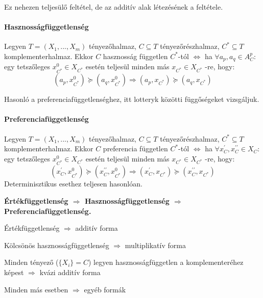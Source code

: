 \documentclass[a4paper,12pt]{article}
\begin{document}
Ez nehezen teljesülő feltétel, de az additív alak létezésének a feltétele.

\paragraph{Hasznosságfüggetlenség}

Legyen $T=(X_1,...,X_m)$ tényezőhalmaz, $C \subseteq T$ tényezőrészhalmaz,  $C^* \subseteq T $ komplementerhalmaz. Ekkor $C$ hasznosság független $C^*$-tól $\Leftrightarrow$ ha $\forall a_{p}, a_q \in A^p_C:$  egy tetszőleges $x_{C^{*}}^0 \in X_{C^*}$  esetén teljesül minden más $ x_{C^{*}} \in X_{C^*}$ -re, hogy:
\begin{equation}
(a_p, x_{C^{*}}^0) \succeq (a_q, x_{C^{*}}^0) 
\Rightarrow
(a_p, x_{C^{*}}) \succeq (a_q, x_{C^{*}}) 
\end{equation}

Hasonló a preferenciafüggetlenséghez, itt lotteryk közötti függőségeket vizsgáljuk.

\paragraph{Preferenciafüggetlenség}

Legyen $T=(X_1,...,X_m)$ tényezőhalmaz, $C \subseteq T$ tényezőrészhalmaz,  $C^* \subseteq T $ komplementerhalmaz. Ekkor $C$ preferencia független $C^*$-tól $\Leftrightarrow$ ha $\forall x_C^{\prime}, x_C^{\prime\prime} \in X_C:$  egy tetszőleges $x_{C^{*}}^0 \in X_{C^*}$  esetén teljesül minden más $ x_{C^{*}} \in X_{C^*}$ -re, hogy:
\begin{equation}
(x_C^{\prime}, x_{C^{*}}^0) \succeq (x_C^{\prime\prime}, x_{C^{*}}^0) 
\Rightarrow
(x_C^{\prime}, x_{C^{*}}) \succeq (x_C^{\prime\prime}, x_{C^{*}}) 
\end{equation}
Determinisztikus esethez teljesen hasonlóan.

\textbf{Értékfüggetlenség $\Rightarrow$ Hasznosságfüggetlenség $\Rightarrow$ Preferenciafüggetlenség.}

Értékfüggetlenség $\Rightarrow$ additív forma

Kölcsönös hasznosságfüggetlenség  $\Rightarrow$ multiplikatív forma

Minden tényező ($\{X_i\} = C$) legyen hasznosságfüggetlen a komplementeréhez képest $\Rightarrow$ kvázi additív forma

Minden más esetben  $\Rightarrow$ egyéb formák
\end{document}
